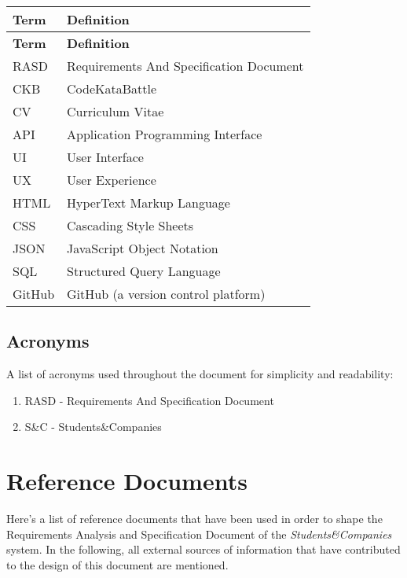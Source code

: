 \begin{longtable}{@{} l p{\textwidth} @{}}
\textbf{Term} & \textbf{Definition} \\
\hline
\endfirsthead

\textbf{Term} & \textbf{Definition} \\
\hline
\endhead

RASD & Requirements And Specification Document \\
CKB & CodeKataBattle \\
CV & Curriculum Vitae \\
API & Application Programming Interface \\
UI & User Interface \\
UX & User Experience \\
HTML & HyperText Markup Language \\
CSS & Cascading Style Sheets \\
JSON & JavaScript Object Notation \\
SQL & Structured Query Language \\
GitHub & GitHub (a version control platform) \\
\end{longtable}








\subsection{Acronyms}

A list of acronyms used throughout the document for simplicity and readability:

\begin{enumerate}
    \item RASD - Requirements And Specification Document
    \item S\&C - Students\&Companies
\end{enumerate}


\section{Reference Documents}

Here’s a list of reference documents that have been used in order to shape the Requirements Analysis and Specification Document of the \textit{Students\&Companies} system. In the following, all external sources of information that have contributed to the design of this document are mentioned.

